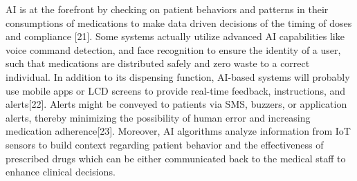AI is at the forefront by checking on patient behaviors and patterns in their consumptions of medications to make data driven decisions of the timing of doses and compliance [21]. Some systems actually utilize advanced AI capabilities like voice command detection, and face recognition to ensure the identity of a user, such that medications are distributed safely and zero waste to a correct individual. 
In addition to its dispensing function, AI-based systems will probably use mobile apps or LCD screens to provide real-time feedback, instructions, and alerts[22]. Alerts might be conveyed to patients via SMS, buzzers, or application alerts, thereby minimizing the possibility of human error and increasing medication adherence[23]. Moreover, AI algorithms analyze information from IoT sensors to build context regarding patient behavior and the effectiveness of prescribed drugs which can be either communicated back to the medical staff to enhance clinical decisions.
